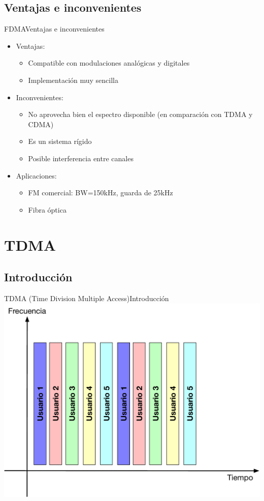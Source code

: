\documentclass[10pt,compress]{beamer} %
\begin{document}
\subsection{Ventajas e inconvenientes}
\begin{frame}{FDMA}{Ventajas e inconvenientes}
  \begin{itemize}
    \item Ventajas:
      \begin{itemize}
        \item Compatible con modulaciones analógicas y digitales
        \item Implementación muy sencilla
      \end{itemize}
    \item Inconvenientes:
      \begin{itemize}
        \item No aprovecha bien el espectro disponible (en comparación con TDMA y CDMA)
        \item Es un sistema rígido
        \item Posible interferencia entre canales
      \end{itemize}
    \item Aplicaciones:
      \begin{itemize}
        \item FM comercial: BW=150kHz, guarda de 25kHz
        \item Fibra óptica
      \end{itemize}
  \end{itemize}
\end{frame}


\section{TDMA}
\subsection{Introducción}
\begin{frame}{TDMA (Time Division Multiple Access)}{Introducción}
  \centering \includegraphics[width=0.8\linewidth]{Figuras/TDMA.pdf}
\end{frame}
\end{document}
